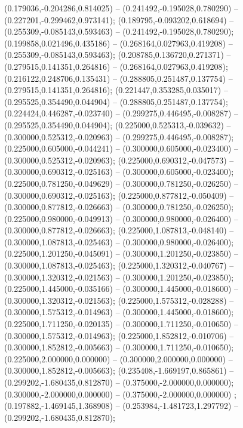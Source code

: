  (0.179036,-0.204286,0.814025) -- (0.241492,-0.195028,0.780290) -- (0.227201,-0.299462,0.973141);
 (0.189795,-0.093202,0.618694) -- (0.255309,-0.085143,0.593463) -- (0.241492,-0.195028,0.780290);
 (0.199858,0.021496,0.435186) -- (0.268164,0.027963,0.419208) -- (0.255309,-0.085143,0.593463);
 (0.208785,0.136720,0.271371) -- (0.279515,0.141351,0.264816) -- (0.268164,0.027963,0.419208);
 (0.216122,0.248706,0.135431) -- (0.288805,0.251487,0.137754) -- (0.279515,0.141351,0.264816);
 (0.221447,0.353285,0.035017) -- (0.295525,0.354490,0.044904) -- (0.288805,0.251487,0.137754);
 (0.224424,0.446287,-0.023740) -- (0.299275,0.446495,-0.008287) -- (0.295525,0.354490,0.044904);
 (0.225000,0.525313,-0.039632) -- (0.300000,0.525312,-0.020963) -- (0.299275,0.446495,-0.008287);
 (0.225000,0.605000,-0.044241) -- (0.300000,0.605000,-0.023400) -- (0.300000,0.525312,-0.020963);
 (0.225000,0.690312,-0.047573) -- (0.300000,0.690312,-0.025163) -- (0.300000,0.605000,-0.023400);
 (0.225000,0.781250,-0.049629) -- (0.300000,0.781250,-0.026250) -- (0.300000,0.690312,-0.025163);
 (0.225000,0.877812,-0.050409) -- (0.300000,0.877812,-0.026663) -- (0.300000,0.781250,-0.026250);
 (0.225000,0.980000,-0.049913) -- (0.300000,0.980000,-0.026400) -- (0.300000,0.877812,-0.026663);
 (0.225000,1.087813,-0.048140) -- (0.300000,1.087813,-0.025463) -- (0.300000,0.980000,-0.026400);
 (0.225000,1.201250,-0.045091) -- (0.300000,1.201250,-0.023850) -- (0.300000,1.087813,-0.025463);
 (0.225000,1.320312,-0.040767) -- (0.300000,1.320312,-0.021563) -- (0.300000,1.201250,-0.023850);
 (0.225000,1.445000,-0.035166) -- (0.300000,1.445000,-0.018600) -- (0.300000,1.320312,-0.021563);
 (0.225000,1.575312,-0.028288) -- (0.300000,1.575312,-0.014963) -- (0.300000,1.445000,-0.018600);
 (0.225000,1.711250,-0.020135) -- (0.300000,1.711250,-0.010650) -- (0.300000,1.575312,-0.014963);
 (0.225000,1.852812,-0.010706) -- (0.300000,1.852812,-0.005663) -- (0.300000,1.711250,-0.010650);
 (0.225000,2.000000,0.000000) -- (0.300000,2.000000,0.000000) -- (0.300000,1.852812,-0.005663);
 (0.235408,-1.669197,0.865861) -- (0.299202,-1.680435,0.812870) -- (0.375000,-2.000000,0.000000);
 (0.300000,-2.000000,0.000000) -- (0.375000,-2.000000,0.000000) ;
 (0.197882,-1.469145,1.368908) -- (0.253984,-1.481723,1.297792) -- (0.299202,-1.680435,0.812870);
